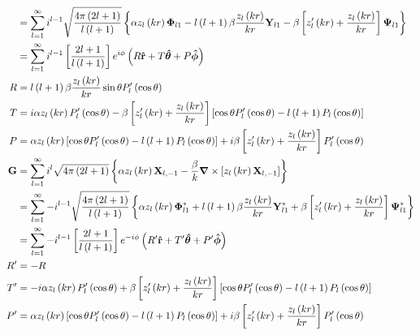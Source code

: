 \documentclass[a4paper, 10pt] {article}
\begin{document}
\begin{align}
            &=\sum_{l=1}^{\infty}i^{l-1}\sqrt{\frac{4\pi\left( 2l+1 \right)}{l\left( l+1 \right)}}\left\{ \alpha z_{l}\left( kr \right)\boldsymbol{\Phi}_{l1}-l\left( l+1 \right)\beta\frac{z_{l}\left( kr \right)}{kr}\mathbf{Y}_{l1}-\beta\left[ z_{l}'\left( kr \right)+\frac{z_{l}\left( kr \right)}{kr} \right] \boldsymbol{\Psi}_{l1} \right\}\nonumber\\
            &=\sum_{l=1}^{\infty}i^{l-1}\left[ \frac{2l+1}{l\left( l+1 \right)} \right]e^{i\phi}\left( R\vu{\mathbf{r}}+T\vu{\boldsymbol{\theta}}+P\vu{\boldsymbol{\phi}} \right)\\
  R&=l\left( l+1 \right)\beta\frac{z_{l}\left( kr \right)}{kr}\sin\theta P_{l}'\left( \cos\theta \right)\\
  T&=i\alpha z_{l}\left( kr \right)P_{l}'\left( \cos\theta \right)-\beta\left[ z_{l}'\left( kr \right)+\frac{z_{l}\left( kr \right)}{kr} \right]\left[ \cos\theta P_{l}'\left( \cos\theta \right)-l\left( l+1 \right)P_{l}\left( \cos\theta \right) \right]\\
  P&=\alpha z_{l}\left( kr \right)\left[ \cos\theta P_{l}'\left( \cos\theta \right)-l\left( l+1 \right)P_{l}\left( \cos\theta \right) \right]+i\beta\left[ z_{l}'\left( kr \right)+\frac{z_{l}\left( kr \right)}{kr} \right]P_{l}'\left( \cos\theta \right)\\
  \mathbf{G}&=\sum_{l=1}^{\infty}i^{l}\sqrt{4\pi\left( 2l+1 \right)}\left\{ \alpha z_{l}\left( kr \right)\mathbf{X}_{l,-1}-\frac{\beta}{k}\boldsymbol{\nabla}\times{\left[ z_{l}\left( kr \right)\mathbf{X}_{l,-1} \right]} \right\}\\
            &=\sum_{l=1}^{\infty}-i^{l-1}\sqrt{\frac{4\pi\left( 2l+1 \right)}{l\left( l+1 \right)}}\left\{ \alpha z_{l}\left( kr \right)\boldsymbol{\Phi}_{l1}^{*}+l\left( l+1 \right)\beta \frac{z_{l}\left( kr \right)}{kr}\mathbf{Y}_{l1}^{*}+\beta\left[ z_{l}'\left( kr \right)+\frac{z_{l}\left( kr \right)}{kr} \right]\boldsymbol{\Psi}_{l1}^{*}\right\}\\
            &=\sum_{l=1}^{\infty}-i^{l-1}\left[ \frac{2l+1}{l\left( l+1 \right)} \right]e^{-i\phi}\left( R'\vu{\mathbf{r}}+T'\vu{\boldsymbol{\theta}}+P'\vu{\boldsymbol{\phi}} \right)\\
  R'&=-R\\
  T'&=-i\alpha z_{l}\left( kr \right)P_{l}'\left( \cos\theta \right)+\beta\left[ z_{l}'\left( kr \right)+\frac{z_{l}\left( kr \right)}{kr} \right]\left[ \cos\theta P_{l}'\left( \cos\theta \right)-l\left( l+1 \right)P_{l}\left( \cos\theta \right) \right]\\
  P'&=\alpha z_{l}\left( kr \right)\left[ \cos\theta P_{l}'\left( \cos\theta \right)-l\left( l+1 \right)P_{l}\left( \cos\theta \right) \right]+i\beta\left[ z_{l}'\left( kr \right)+\frac{z_{l}\left( kr \right)}{kr} \right]P_{l}'\left( \cos\theta \right)\\
\end{align}
\end{document}
